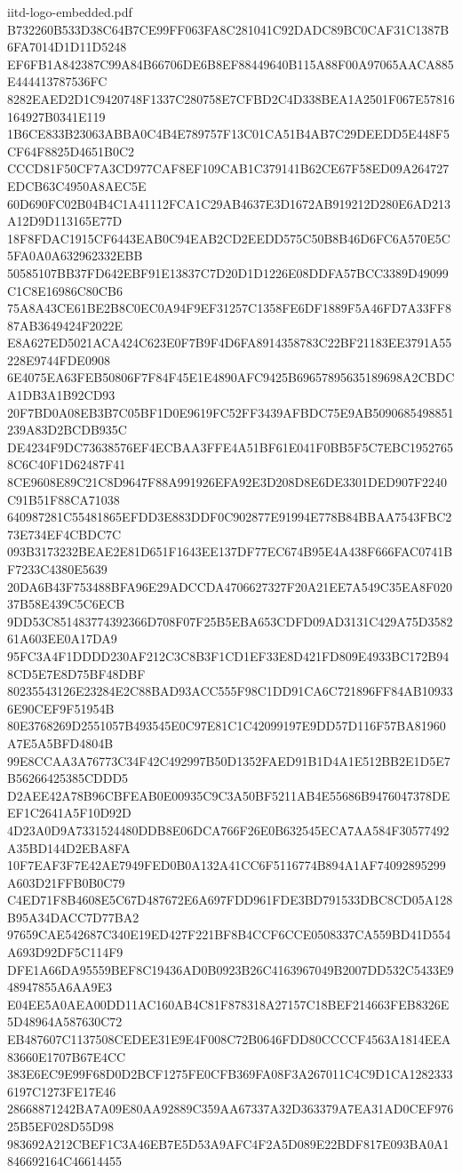 \begin{filecontents*}[overwrite]{iitd-logo-embedded.pdf}
B732260B533D38C64B7CE99FF063FA8C281041C92DADC89BC0CAF31C1387B6FA7014D1D11D5248
EF6FB1A842387C99A84B66706DE6B8EF88449640B115A88F00A97065AACA885E444413787536FC
8282EAED2D1C9420748F1337C280758E7CFBD2C4D338BEA1A2501F067E57816164927B0341E119
1B6CE833B23063ABBA0C4B4E789757F13C01CA51B4AB7C29DEEDD5E448F5CF64F8825D4651B0C2
CCCD81F50CF7A3CD977CAF8EF109CAB1C379141B62CE67F58ED09A264727EDCB63C4950A8AEC5E
60D690FC02B04B4C1A41112FCA1C29AB4637E3D1672AB919212D280E6AD213A12D9D113165E77D
18F8FDAC1915CF6443EAB0C94EAB2CD2EEDD575C50B8B46D6FC6A570E5C5FA0A0A632962332EBB
50585107BB37FD642EBF91E13837C7D20D1D1226E08DDFA57BCC3389D49099C1C8E16986C80CB6
75A8A43CE61BE2B8C0EC0A94F9EF31257C1358FE6DF1889F5A46FD7A33FF887AB3649424F2022E
E8A627ED5021ACA424C623E0F7B9F4D6FA8914358783C22BF21183EE3791A55228E9744FDE0908
6E4075EA63FEB50806F7F84F45E1E4890AFC9425B69657895635189698A2CBDCA1DB3A1B92CD93
20F7BD0A08EB3B7C05BF1D0E9619FC52FF3439AFBDC75E9AB5090685498851239A83D2BCDB935C
DE4234F9DC73638576EF4ECBAA3FFE4A51BF61E041F0BB5F5C7EBC19527658C6C40F1D62487F41
8CE9608E89C21C8D9647F88A991926EFA92E3D208D8E6DE3301DED907F2240C91B51F88CA71038
640987281C55481865EFDD3E883DDF0C902877E91994E778B84BBAA7543FBC273E734EF4CBDC7C
093B3173232BEAE2E81D651F1643EE137DF77EC674B95E4A438F666FAC0741BF7233C4380E5639
20DA6B43F753488BFA96E29ADCCDA4706627327F20A21EE7A549C35EA8F02037B58E439C5C6ECB
9DD53C851483774392366D708F07F25B5EBA653CDFD09AD3131C429A75D358261A603EE0A17DA9
95FC3A4F1DDDD230AF212C3C8B3F1CD1EF33E8D421FD809E4933BC172B948CD5E7E8D75BF48DBF
80235543126E23284E2C88BAD93ACC555F98C1DD91CA6C721896FF84AB109336E90CEF9F51954B
80E3768269D2551057B493545E0C97E81C1C42099197E9DD57D116F57BA81960A7E5A5BFD4804B
99E8CCAA3A76773C34F42C492997B50D1352FAED91B1D4A1E512BB2E1D5E7B56266425385CDDD5
D2AEE42A78B96CBFEAB0E00935C9C3A50BF5211AB4E55686B9476047378DEEF1C2641A5F10D92D
4D23A0D9A7331524480DDB8E06DCA766F26E0B632545ECA7AA584F30577492A35BD144D2EBA8FA
10F7EAF3F7E42AE7949FED0B0A132A41CC6F5116774B894A1AF74092895299A603D21FFB0B0C79
C4ED71F8B4608E5C67D487672E6A697FDD961FDE3BD791533DBC8CD05A128B95A34DACC7D77BA2
97659CAE542687C340E19ED427F221BF8B4CCF6CCE0508337CA559BD41D554A693D92DF5C114F9
DFE1A66DA95559BEF8C19436AD0B0923B26C4163967049B2007DD532C5433E948947855A6AA9E3
E04EE5A0AEA00DD11AC160AB4C81F878318A27157C18BEF214663FEB8326E5D48964A587630C72
EB487607C1137508CEDEE31E9E4F008C72B0646FDD80CCCCF4563A1814EEA83660E1707B67E4CC
383E6EC9E99F68D0D2BCF1275FE0CFB369FA08F3A267011C4C9D1CA12823336197C1273FE17E46
28668871242BA7A09E80AA92889C359AA67337A32D363379A7EA31AD0CEF97625B5EF028D55D98
983692A212CBEF1C3A46EB7E5D53A9AFC4F2A5D089E22BDF817E093BA0A1846692164C46614455

\end{filecontents*}
